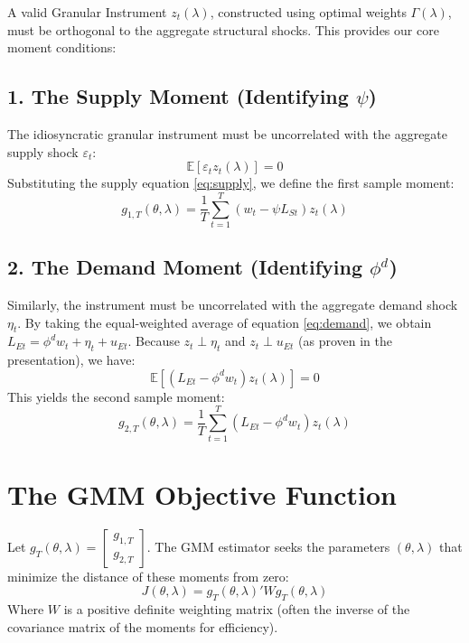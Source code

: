 \documentclass[11pt]{article}
\begin{document}
A valid Granular Instrument $z_t(\lambda)$, constructed using optimal weights $\Gamma(\lambda)$, must be orthogonal to the aggregate structural shocks. This provides our core moment conditions:

\subsection{1. The Supply Moment (Identifying $\psi$)}
The idiosyncratic granular instrument must be uncorrelated with the aggregate supply shock $\varepsilon_t$:
\begin{equation}
    \mathbb{E}[\varepsilon_t z_t(\lambda)] = 0
\end{equation}
Substituting the supply equation \ref{eq:supply}, we define the first sample moment:
\begin{equation}
    g_{1,T}(\theta, \lambda) = \frac{1}{T} \sum_{t=1}^T (w_t - \psi L_{St}) z_t(\lambda)
\end{equation}

\subsection{2. The Demand Moment (Identifying $\phi^d$)}
Similarly, the instrument must be uncorrelated with the aggregate demand shock $\eta_t$. By taking the equal-weighted average of equation \ref{eq:demand}, we obtain $L_{Et} = \phi^d w_t + \eta_t + u_{Et}$. Because $z_t \perp \eta_t$ and $z_t \perp u_{Et}$ (as proven in the presentation), we have:
\begin{equation}
    \mathbb{E}[(L_{Et} - \phi^d w_t) z_t(\lambda)] = 0
\end{equation}
This yields the second sample moment:
\begin{equation}
    g_{2,T}(\theta, \lambda) = \frac{1}{T} \sum_{t=1}^T (L_{Et} - \phi^d w_t) z_t(\lambda)
\end{equation}

\section{The GMM Objective Function}
Let $g_T(\theta, \lambda) = \begin{bmatrix} g_{1,T} \\ g_{2,T} \end{bmatrix}$. The GMM estimator seeks the parameters $(\theta, \lambda)$ that minimize the distance of these moments from zero:
\begin{equation}
    J(\theta, \lambda) = g_T(\theta, \lambda)' W g_T(\theta, \lambda)
\end{equation}
Where $W$ is a positive definite weighting matrix (often the inverse of the covariance matrix of the moments for efficiency).
\end{document}
